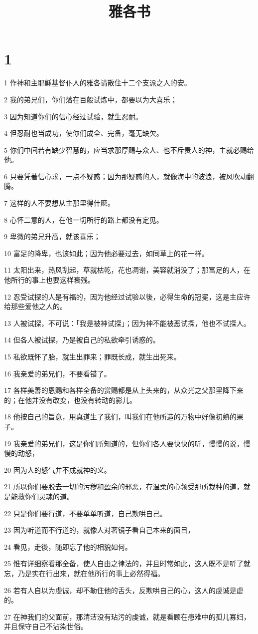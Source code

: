 

\title{雅各书}


\chapter{1}

\par 1 作神和主耶稣基督仆人的雅各请散住十二个支派之人的安。
\par 2 我的弟兄们，你们落在百般试炼中，都要以为大喜乐；
\par 3 因为知道你们的信心经过试验，就生忍耐。
\par 4 但忍耐也当成功，使你们成全、完备，毫无缺欠。
\par 5 你们中间若有缺少智慧的，应当求那厚赐与众人、也不斥责人的神，主就必赐给他。
\par 6 只要凭著信心求，一点不疑惑；因为那疑惑的人，就像海中的波浪，被风吹动翻腾。
\par 7 这样的人不要想从主那里得什麽。
\par 8 心怀二意的人，在他一切所行的路上都没有定见。
\par 9 卑微的弟兄升高，就该喜乐；
\par 10 富足的降卑，也该如此；因为他必要过去，如同草上的花一样。
\par 11 太阳出来，热风刮起，草就枯乾，花也凋谢，美容就消没了；那富足的人，在他所行的事上也要这样衰残。
\par 12 忍受试探的人是有福的，因为他经过试验以後，必得生命的冠冕，这是主应许给那些爱他之人的。
\par 13 人被试探，不可说：「我是被神试探」；因为神不能被恶试探，他也不试探人。
\par 14 但各人被试探，乃是被自己的私欲牵引诱惑的。
\par 15 私欲既怀了胎，就生出罪来；罪既长成，就生出死来。
\par 16 我亲爱的弟兄们，不要看错了。
\par 17 各样美善的恩赐和各样全备的赏赐都是从上头来的，从众光之父那里降下来的；在他并没有改变，也没有转动的影儿。
\par 18 他按自己的旨意，用真道生了我们，叫我们在他所造的万物中好像初熟的果子。
\par 19 我亲爱的弟兄们，这是你们所知道的，但你们各人要快快的听，慢慢的说，慢慢的动怒，
\par 20 因为人的怒气并不成就神的义。
\par 21 所以你们要脱去一切的污秽和盈余的邪恶，存温柔的心领受那所栽种的道，就是能救你们灵魂的道。
\par 22 只是你们要行道，不要单单听道，自己欺哄自己。
\par 23 因为听道而不行道的，就像人对著镜子看自己本来的面目，
\par 24 看见，走後，随即忘了他的相貌如何。
\par 25 惟有详细察看那全备，使人自由之律法的，并且时常如此，这人既不是听了就忘，乃是实在行出来，就在他所行的事上必然得福。
\par 26 若有人自以为虔诚，却不勒住他的舌头，反欺哄自己的心，这人的虔诚是虚的。
\par 27 在神我们的父面前，那清洁没有玷污的虔诚，就是看顾在患难中的孤儿寡妇，并且保守自己不沾染世俗。

